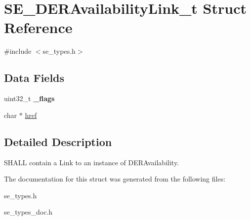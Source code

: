 \hypertarget{structSE__DERAvailabilityLink__t}{}\section{S\+E\+\_\+\+D\+E\+R\+Availability\+Link\+\_\+t Struct Reference}
\label{structSE__DERAvailabilityLink__t}


{\ttfamily \#include $<$se\+\_\+types.\+h$>$}

\subsection*{Data Fields}
\begin{DoxyCompactItemize}
\item 
uint32\+\_\+t {\bfseries \+\_\+flags}
\item 
char $\ast$ \hyperlink{group__DERAvailabilityLink_gaa5f882cd5ce06b825c13963b592d969a}{href}
\end{DoxyCompactItemize}


\subsection{Detailed Description}
S\+H\+A\+LL contain a Link to an instance of D\+E\+R\+Availability. 

The documentation for this struct was generated from the following files\+:\begin{DoxyCompactItemize}
\item 
se\+\_\+types.\+h\item 
se\+\_\+types\+\_\+doc.\+h\end{DoxyCompactItemize}
